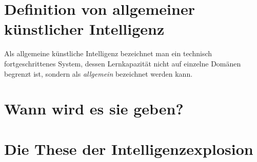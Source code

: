 \section{Definition von allgemeiner künstlicher Intelligenz}
Als allgemeine künstliche Intelligenz bezeichnet man ein technisch fortgeschrittenes System, dessen Lernkapazität nicht auf einzelne Domänen begrenzt ist, sondern als \emph{allgemein} bezeichnet werden kann. 
\section{Wann wird es sie geben?}
\section{Die These der Intelligenzexplosion}

